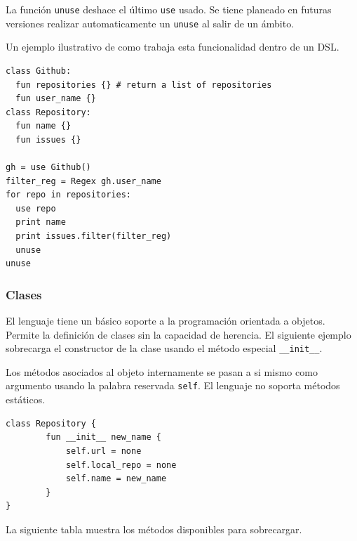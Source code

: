 \documentclass[11pt]{article}
\begin{document}
La función \texttt{unuse} deshace el último \texttt{use} usado. Se tiene planeado en futuras versiones realizar automaticamente un \texttt{unuse} al salir de un ámbito.

Un ejemplo ilustrativo de como trabaja esta funcionalidad dentro de un DSL.

\begin{verbatim}
class Github:
  fun repositories {} # return a list of repositories
  fun user_name {}
class Repository:
  fun name {}
  fun issues {}

gh = use Github()
filter_reg = Regex gh.user_name
for repo in repositories:
  use repo
  print name
  print issues.filter(filter_reg)
  unuse
unuse
\end{verbatim}

\subsubsection{Clases}
\label{sec:org7afadba}
El lenguaje tiene un básico soporte a la programación orientada a objetos. Permite la definición
de clases sin la capacidad de herencia. El siguiente ejemplo sobrecarga el constructor de la clase
usando el método especial \texttt{\_\_init\_\_}.

Los métodos asociados al objeto internamente se pasan a si mismo como argumento usando la palabra
reservada \texttt{self}. El lenguaje no soporta métodos estáticos.


\begin{verbatim}
class Repository {
        fun __init__ new_name {
            self.url = none
            self.local_repo = none
            self.name = new_name
        }
}
\end{verbatim}

La siguiente tabla muestra los métodos disponibles para sobrecargar.
\end{document}

